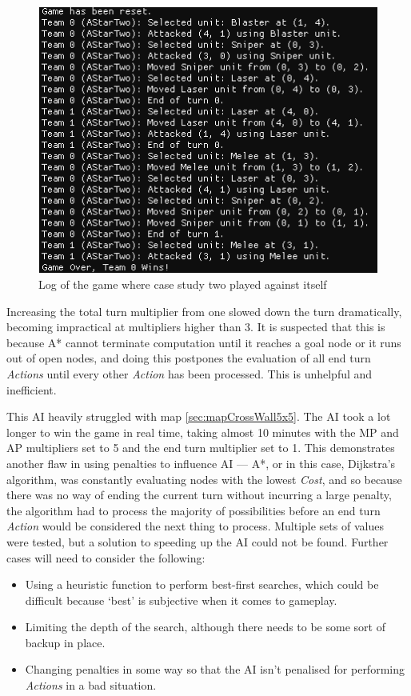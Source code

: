 \documentclass[11pt, a4paper]{report}
\begin{document}
\begin{figure}[!h]
  \centering
  \includegraphics[width=12cm]{img/case_two_suicide.png}
  \caption{Log of the game where case study two played against itself}
  \label{fig:caseStudyTwoSuicide}
\end{figure}

Increasing the total turn multiplier from one slowed down the turn dramatically, becoming impractical at multipliers higher than 3. It is suspected that this is because A* cannot terminate computation until it reaches a goal node or it runs out of open nodes, and doing this postpones the evaluation of all end turn \emph{Actions} until every other \emph{Action} has been processed. This is unhelpful and inefficient.

This AI heavily struggled with map \ref{sec:mapCrossWall5x5}. The AI took a lot longer to win the game in real time, taking almost 10 minutes with the MP and AP multipliers set to 5 and the end turn multiplier set to 1. This demonstrates another flaw in using penalties to influence AI --- A*, or in this case, Dijkstra's algorithm, was constantly evaluating nodes with the lowest \emph{Cost}, and so because there was no way of ending the current turn without incurring a large penalty, the algorithm had to process the majority of possibilities before an end turn \emph{Action} would be considered the next thing to process. Multiple sets of values were tested, but a solution to speeding up the AI could not be found. Further cases will need to consider the following: 

\begin{itemize}
  \item Using a heuristic function to perform best-first searches, which could be difficult because `best' is subjective when it comes to gameplay.
  \item Limiting the depth of the search, although there needs to be some sort of backup in place.
  \item Changing penalties in some way so that the AI isn't penalised for performing \emph{Actions} in a bad situation.
\end{itemize}
\end{document}
